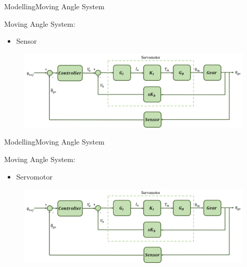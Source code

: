 \begin{frame}{Modelling}{Moving Angle System}
  \begin{block}{Moving Angle System:}

	  \begin{itemize}
	  	\item Sensor
	  \end{itemize}

	  \begin{figure}
        \includegraphics[scale=0.26]{../report/figures/servo+gear+noise.png}
      \end{figure}
  
  \end{block}
\end{frame}

\begin{frame}{Modelling}{Moving Angle System}
  \begin{block}{Moving Angle System:}

	  \begin{itemize}
	  	\item Servomotor
	  \end{itemize}

	  \begin{figure}
        \includegraphics[scale=0.26]{../report/figures/servo+gear+noise.png}
      \end{figure}
  
  \end{block}
\end{frame}

